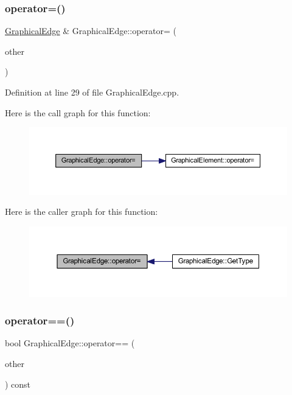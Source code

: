 \subsubsection{\texorpdfstring{operator=()}{operator=()}}
{\footnotesize\ttfamily \hyperlink{class_graphical_edge}{Graphical\+Edge} \& Graphical\+Edge\+::operator= (\begin{DoxyParamCaption}\item[{const \hyperlink{class_graphical_edge}{Graphical\+Edge} \&}]{other }\end{DoxyParamCaption})}



Definition at line 29 of file Graphical\+Edge.\+cpp.

Here is the call graph for this function\+:
\nopagebreak
\begin{figure}[H]
\begin{center}
\leavevmode
\includegraphics[width=350pt]{class_graphical_edge_ad590b20ea1c1cb30a15850a36f82a2c9_cgraph}
\end{center}
\end{figure}
Here is the caller graph for this function\+:
\nopagebreak
\begin{figure}[H]
\begin{center}
\leavevmode
\includegraphics[width=350pt]{class_graphical_edge_ad590b20ea1c1cb30a15850a36f82a2c9_icgraph}
\end{center}
\end{figure}
\mbox{\label{class_graphical_edge_aa03597dca35cc2f08c8a1894657546d8}} 
\subsubsection{\texorpdfstring{operator==()}{operator==()}}
{\footnotesize\ttfamily bool Graphical\+Edge\+::operator== (\begin{DoxyParamCaption}\item[{const \hyperlink{class_graphical_edge}{Graphical\+Edge} \&}]{other }\end{DoxyParamCaption}) const\hspace{0.3cm}{\ttfamily [inline]}}



